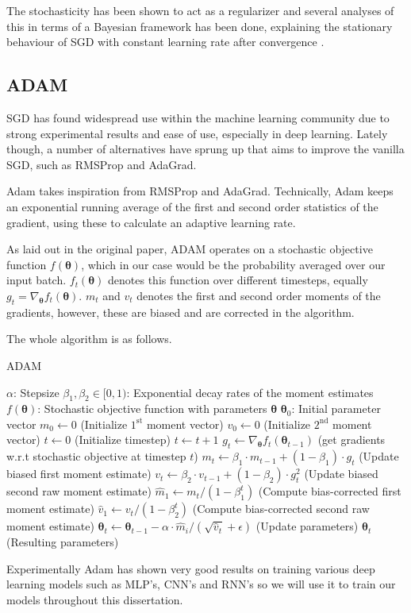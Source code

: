 The stochasticity has been shown to act as a regularizer and several analyses of
this in terms of a Bayesian framework has been done, explaining the stationary
behaviour of SGD with constant learning rate after convergence
\cite{mandt_stochastic_2017, mandt_variational_2016}.

\subsection{ADAM}
SGD has found widespread use within the machine learning community due to strong
experimental results and ease of use, especially in deep learning. Lately
though, a number of alternatives have sprung up that aims to improve the vanilla
SGD, such as RMSProp\cite{Tieleman2012} and AdaGrad\cite{Duchi:EECS-2010-24}.

Adam takes inspiration from RMSProp and AdaGrad. Technically, Adam keeps an
exponential running average of the first and second order statistics of the
gradient, using these to calculate an adaptive learning rate.

As laid out in the original paper, ADAM operates on a stochastic objective
function $f(\bm{\theta})$, which in our case would be the probability averaged
over our input batch. $f_t(\bm{\theta})$ denotes this function over different
timesteps, equally $g_t = \nabla_{\bm{\theta}} f_t(\bm{\theta})$. $m_t$ and
$v_t$ denotes the first and second order moments of the gradients, however,
these are biased and are corrected in the algorithm.

The whole algorithm is as follows.

\begin{algorithm}
  \caption{ADAM}\label{ADAM}
  \begin{algorithmic}[1]
    \Require $\alpha$: Stepsize
    \Require $\beta_1, \beta_2 \in [0, 1)$: Exponential decay rates of the moment estimates
    \Require $f(\bm{\theta})$: Stochastic objective function with parameters
    $\bm{\theta}$
    \Require $\bm{\theta}_0$: Initial parameter vector
    \State $m_0 \gets 0$ (Initialize $1^{\text{st}}$ moment vector)
    \State $v_0 \gets 0$ (Initialize $2^{\text{nd}}$ moment vector)
    \State $t \gets 0$ (Initialize timestep)
    \State $t \gets t + 1$
    \State $g_t \gets \nabla_{\bm{\theta}}f_t(\bm{\theta}_{t-1})$ (get gradients w.r.t stochastic objective at timestep $t$)
    \State $m_t \gets \beta_1 \cdot m_{t-1} + (1 - \beta_1) \cdot g_t$ (Update biased first moment estimate)
    \State $v_t \gets \beta_2 \cdot v_{t-1} + (1 - \beta_2) \cdot g^2_t$ (Update biased second raw moment estimate)
    \State $\hat{m}_1 \gets m_t / (1 - \beta^t_1)$ (Compute bias-corrected first moment estimate)
    \State $\hat{v}_1 \gets v_t / (1 - \beta^t_2)$ (Compute bias-corrected second raw moment estimate)
    \State $\bm{\theta}_t \gets \bm{\theta}_{t-1} - \alpha \cdot \hat{m}_i/(\sqrt{\hat{v}_t} + \epsilon)$ (Update parameters)
    \EndWhile
    \Return $\bm{\theta}_t$ (Resulting parameters)
  \end{algorithmic}
\end{algorithm}

Experimentally Adam has shown very good results on training various deep
learning models such as MLP's, CNN's and RNN's so we will use it to train our
models throughout this dissertation\cite{kingma_adam:_2014}.